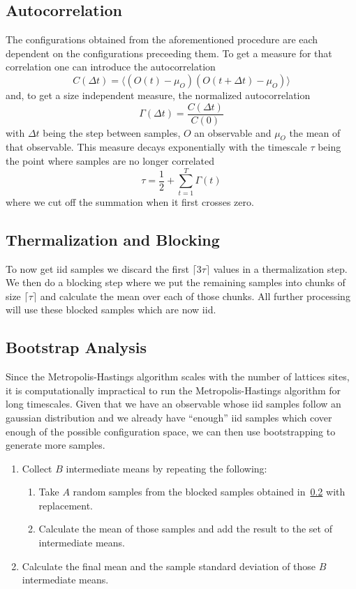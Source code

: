 \subsection{Autocorrelation}
The configurations obtained from the aforementioned procedure are each dependent on the configurations preceeding them.  To get a measure for that correlation one can introduce the autocorrelation
\begin{equation}
	C(\Delta t) = \langle(O(t) - \mu_O)(O(t + \Delta t) - \mu_O) \rangle
\end{equation}
and, to get a size independent measure, the normalized autocorrelation
\begin{equation}
	\Gamma(\Delta t) = \frac{C(\Delta t)}{C(0)}
\end{equation}
with $\Delta t$ being the step between samples, $O$ an observable and $\mu_O$ the mean of that observable. This measure decays exponentially with the timescale $\tau$ being the point where samples are no longer correlated
\begin{equation}
	\tau = \frac{1}{2} + \sum^{T}_{t=1}{\Gamma(t)}
\end{equation}
where we cut off the summation when it first crosses zero.

\subsection{Thermalization and Blocking}\label{sec:blocking}
To now get iid samples we discard the first $\lceil 3\tau \rceil$ values in a thermalization step. We then do a blocking step where we put the remaining samples into chunks of size $\lceil \tau \rceil$ and calculate the mean over each of those chunks. All further processing will use these blocked samples which are now iid.

\subsection{Bootstrap Analysis}\label{sec:bootstrap}
Since the Metropolis-Hastings algorithm scales with the number of lattices sites, it is computationally impractical to run the Metropolis-Hastings algorithm for long timescales. Given that we have an observable whose iid samples follow an gaussian distribution and we already have \enquote{enough} iid samples which cover enough of the possible configuration space, we can then use bootstrapping to generate more samples.
\begin{enumerate}
	\item Collect $B$ intermediate means by repeating the following:
	\begin{enumerate}
		\item Take $A$ random samples from the blocked samples obtained in~\cref{sec:blocking} with replacement.
		\item Calculate the mean of those samples and add the result to the set of intermediate means.
	\end{enumerate}
	\item Calculate the final mean and the sample standard deviation of those $B$ intermediate means.
\end{enumerate}

